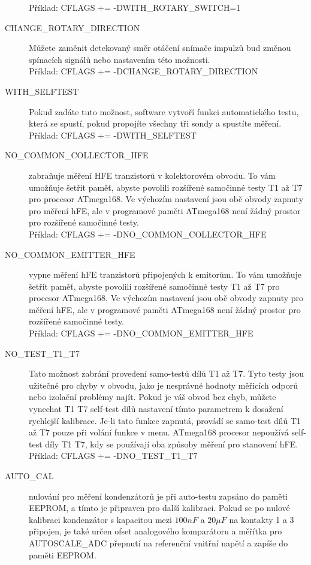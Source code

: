 \begin{description}
Příklad: CFLAGS += -DWITH\_ROTARY\_SWITCH=1
  \item[CHANGE\_ROTARY\_DIRECTION]  Můžete zaměnit detekovaný směr otáčení snímače impulzů bud 
změnou spínacích signálů nebo nastavením této možnosti.\\
Příklad: CFLAGS += -DCHANGE\_ROTARY\_DIRECTION
 \item[WITH\_SELFTEST]  Pokud zadáte tuto možnost, software vytvoří funkci automatického testu,
která se spustí, pokud propojíte všechny tři sondy a spustíte měření.\\
Příklad: CFLAGS += -DWITH\_SELFTEST
  \item[NO\_COMMON\_COLLECTOR\_HFE]  zabraňuje měření HFE tranzistorů v kolektorovém obvodu.
To vám umožňuje šetřit paměť, abyste povolili rozšířené samočinné testy T1 až T7 pro procesor ATmega168.
Ve výchozím nastavení jsou obě obvody zapnuty pro měření hFE,
ale v programové paměti ATmega168 není žádný prostor pro rozšířené samočinné testy.\\
Příklad: CFLAGS += -DNO\_COMMON\_COLLECTOR\_HFE
  \item[NO\_COMMON\_EMITTER\_HFE] vypne měření hFE tranzistorů připojených k emitorům.
To vám umožňuje šetřit paměť, abyste povolili rozšířené samočinné testy T1 až T7 pro procesor ATmega168.
Ve výchozím nastavení jsou obě obvody zapnuty pro měření hFE,
ale v programové paměti ATmega168 není žádný prostor pro rozšířené samočinné testy.\\
Příklad: CFLAGS += -DNO\_COMMON\_EMITTER\_HFE
  \item[NO\_TEST\_T1\_T7] Tato možnost zabrání provedení samo-testů dílů T1 až T7.
Tyto testy jsou užitečné pro chyby v obvodu, jako je nesprávné hodnoty měřicích odporů nebo
izolační problémy najít.
Pokud je váš obvod bez chyb, můžete vynechat T1 T7 self-test dílů nastavení tímto
parametrem k dosažení rychlejší kalibrace.
Je-li tato funkce zapnutá, provádí se samo-test dílů T1 až T7 pouze při volání funkce  v menu.
ATmega168 procesor nepoužívá self-test díly T1 T7, kdy se používají oba způsoby měření pro stanovení hFE.\\
Příklad: CFLAGS += -DNO\_TEST\_T1\_T7
  \item[AUTO\_CAL] nulování pro měření kondenzátorů je při auto-testu zapsáno do paměti EEPROM,
a tímto je připraven pro další kalibraci.
Pokud se po nulové kalibraci kondenzátor s kapacitou mezi \(100nF\) a \(20\mu F\)  na kontakty 1 a 3 
připojen, je také určen ofset analogového komparátoru a měřítka pro AUTOSCALE\_ADC přepnutí
na referenční vnitřní napětí a zapíše do paměti EEPROM.

\end{description}
